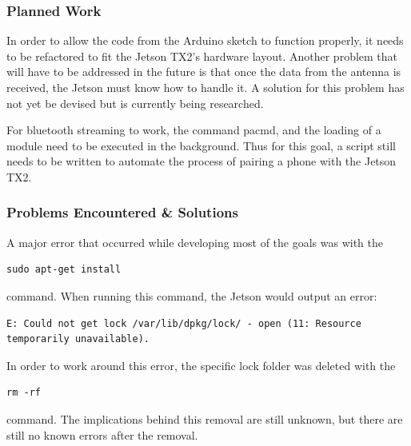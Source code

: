 \documentclass[onecolumn, draftclsnofoot,10pt, compsoc]{IEEEtran}
\begin{document}
\subsubsection{Planned Work}
In order to allow the code from the Arduino sketch to function properly, it needs to be refactored to fit the Jetson TX2's hardware layout. Another problem that will have to be addressed in the future is that once the data from the antenna is received, the Jetson must know how to handle it. A solution for this problem has not yet be devised but is currently being researched.\par

For bluetooth streaming to work, the command pacmd, and the loading of a module need to be executed in the background. Thus for this goal, a script still needs to be written to automate the process of pairing a phone with the Jetson TX2.\par


\subsubsection{Problems Encountered \& Solutions}
A major error that occurred while developing most of the goals was with the \begin{verbatim}sudo apt-get install\end{verbatim} command. When running this command, the Jetson would output an error:\par

\begin{verbatim}
E: Could not get lock /var/lib/dpkg/lock/ - open (11: Resource temporarily unavailable).
\end{verbatim}

In order to work around this error, the specific lock folder was deleted with the \begin{verbatim}rm -rf\end{verbatim} command. The implications behind this removal are still unknown, but there are still no known errors after the removal.  
\end{document}
